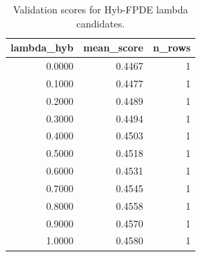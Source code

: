 \begin{table}[t]
\caption{Validation scores for Hyb-FPDE lambda candidates.}
\label{tab:lambda_distribution_computed}
\centering
\begin{tabular}{rrr}
\toprule
lambda\_hyb & mean\_score & n\_rows \\
\midrule
0.0000 & 0.4467 & 1 \\
0.1000 & 0.4477 & 1 \\
0.2000 & 0.4489 & 1 \\
0.3000 & 0.4494 & 1 \\
0.4000 & 0.4503 & 1 \\
0.5000 & 0.4518 & 1 \\
0.6000 & 0.4531 & 1 \\
0.7000 & 0.4545 & 1 \\
0.8000 & 0.4558 & 1 \\
0.9000 & 0.4570 & 1 \\
1.0000 & 0.4580 & 1 \\
\bottomrule
\end{tabular}

\end{table}
